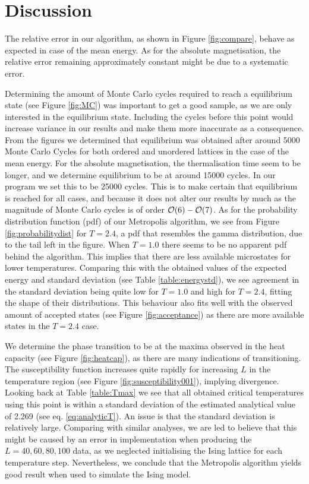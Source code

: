 \section{Discussion}
\label{sec:discussion}
The relative error in our algorithm, as shown in Figure \ref{fig:compare}, behave as expected in case of the mean energy. As for the absolute magnetisation, the relative error remaining approximately constant might be due to a systematic error.

Determining the amount of Monte Carlo cycles required to reach a equilibrium state (see Figure \ref{fig:MC}) was important to get a good sample, as we are only interested in the equilibrium state. Including the cycles before this point would increase variance in our results and make them more inaccurate as a consequence. From the figures we determined that equilibrium was obtained after around 5000 Monte Carlo Cycles for both ordered and unordered lattices in the case of the mean energy. For the absolute magnetisation, the thermalisation time seem to be longer, and we determine equilibrium to be at around 15000 cycles. In our program we set this to be 25000 cycles. This is to make certain that equilibrium is reached for all cases, and because it does not alter our results by much as the magnitude of Monte Carlo cycles is of order $\order{6} - \order{7}$. As for the probability distribution function (pdf) of our Metropolis algorithm, we see from Figure \ref{fig:probabilitydist} for $T=2.4$, a pdf that resembles the gamma distribution, due to the tail left in the figure. When $T=1.0$ there seems to be no apparent pdf behind the algorithm. This implies that there are less available microstates for lower temperatures. Comparing this with the obtained values of the expected energy and standard deviation (see Table \ref{table:energystd}), we see agreement in the standard deviation being quite low for $T=1.0$ and high for $T=2.4$, fitting the shape of their distributions. This behaviour also fits well with the observed amount of accepted states (see Figure \ref{fig:acceptance}) as there are more available states in the $T=2.4$ case.

We determine the phase transition to be at the maxima observed in the heat capacity (see Figure \ref{fig:heatcap}), as there are many indications of transitioning. The susceptibility function increases quite rapidly for increasing $L$ in the temperature region (see Figure \ref{fig:susceptibility001}), implying divergence. Looking back at Table \ref{table:Tmax} we see that all obtained critical temperatures using this point is within a standard deviation of the estimated analytical value of 2.269 (see eq. \ref{eq:analyticT}). An issue is that the standard deviation is relatively large. Comparing with similar analyses, we are led to believe that this might be caused by an error in implementation when producing the $L= 40, 60, 80, 100$ data, as we neglected initialising the Ising lattice for each temperature step. Nevertheless, we conclude that the Metropolis algorithm yields good result when used to simulate the Ising model.
